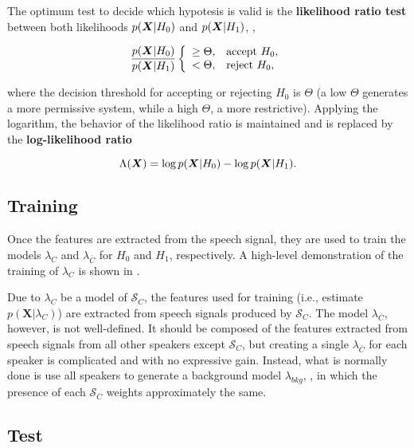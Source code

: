 \noindent The optimum test to decide which hypotesis is valid is the \textbf{likelihood ratio test} between both likelihoods $p(\boldsymbol{X}|H_0)$ and $p(\boldsymbol{X}|H_1)$, ,

\begin{equation}
    \frac{\postpdf{\boldsymbol{X}}{H_0}}{\postpdf{\boldsymbol{X}}{H_1}} \verifytestB{\Theta}{H_0}
    \label{eq:likelihood-ratio-test}
\end{equation}

\noindent where the decision threshold for accepting or rejecting $H_0$ is $\Theta$ (a low $\Theta$ generates a more permissive system, while a high $\Theta$, a more restrictive). Applying the logarithm, the behavior of the likelihood ratio is maintained and  is replaced by the \textbf{log-likelihood ratio}

\begin{equation}
    \Lambda(\boldsymbol{X}) = \log \postpdf{\boldsymbol{X}}{H_0} - \log \postpdf{\boldsymbol{X}}{H_1}.
    \label{eq:log-likelihood-ratio-test}
\end{equation}

\subsection{Training}

Once the features are extracted from the speech signal, they are used to train the models $\lambda_{C}$ and $\lambda_{\overline{C}}$ for $H_0$ and $H_1$, respectively. A high-level demonstration of the training of $\lambda_{C}$ is shown in .

Due to $\lambda_{C}$ be a model of $\mathcal{S}_{C}$, the features used for training (i.e., estimate $p(\boldsymbol{X}|\lambda_{C})$) are extracted from speech signals produced by $\mathcal{S}_{C}$. The model $\lambda_{\overline{C}}$, however, is not well-defined. It should be composed of the features extracted from speech signals from all other speakers except $\mathcal{S}_{C}$, but creating a single $\lambda_{\overline{C}}$ for each speaker is complicated and with no expressive gain. Instead, what is normally done is use all speakers to generate a background model $\lambda_{bkg}$, , in which the presence of each $\mathcal{S}_{C}$ weights approximately the same.

\subsection{Test}

